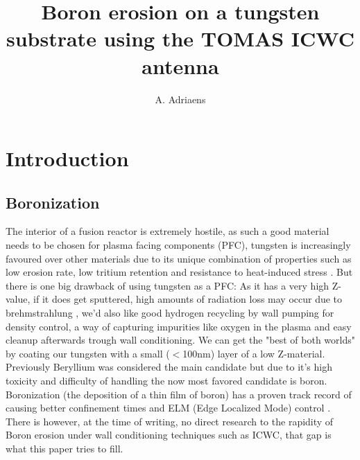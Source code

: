 \documentclass{article}
\title{Boron erosion on a tungsten substrate using the TOMAS ICWC antenna}
\author[1,2]{A. Adriaens}
\affil[1]{Laboratory for Plasma Physics LPP-ERM/KMS, Brussels, Belgium}
\affil[2]{Department of Applied Physics, Ghent University, Belgium}
\date{}
\begin{document}
\maketitle
\section{Introduction}
\subsection{Boronization}
The interior of a fusion reactor is extremely hostile, as such a good material
needs to be chosen for plasma facing components (PFC), tungsten is increasingly
favoured over other materials due to its unique combination of properties such
as low erosion rate, low tritium retention and resistance to heat-induced
stress \cite{PHILIPPS2011S2}\cite{Tungsten}.  But there is one big drawback of
using tungsten as a PFC: As it has a very high Z-value, if it does get
sputtered, high amounts of radiation loss may occur due to brehmstrahlung
\cite{JWinter_1996}, we'd also like good hydrogen recycling by wall pumping for
density control, a way of capturing impurities like oxygen in the plasma and easy cleanup
afterwards trough wall conditioning.  We can get the "best of both worlds" by
coating our tungsten with a small ($<$100nm) layer of a low Z-material.
Previously Beryllium was considered the main candidate but due to it's high
toxicity and difficulty of handling the now most favored candidate is boron.
Boronization (the deposition of a thin film of boron) has a proven track record
of causing better confinement times and ELM (Edge Localized Mode) control
\cite{ASDEXBoronisation}\cite{DIII-DBoronisation}\cite{EASTBoronisation}\cite{TEXTORBoronisation}.
There is however, at the time of writing, no direct research to the rapidity of
Boron erosion under wall conditioning techniques such as ICWC, that gap is what
this paper tries to fill.
\end{document}
